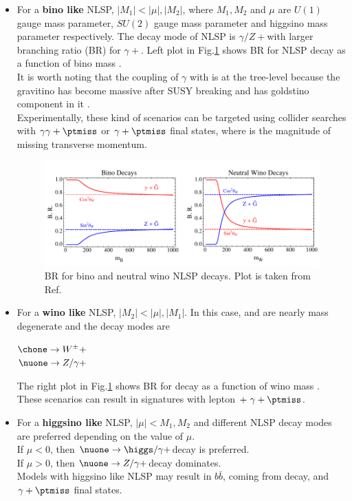 \begin{itemize}
\item For a \textbf{bino like} NLSP, $|M_1| < |\mu|, |M_2|$, where $M_1, M_2$ and $\mu$ are $U(1)$ gauge mass parameter, $SU(2)$ gauge mass parameter and higgsino mass parameter respectively. The decay mode of NLSP is $\gamma/Z +$\grav with larger branching ratio (BR) for  $\gamma +$\grav. Left plot in Fig.\ref{fig:NLSPwinoBinoBR} shows BR for NLSP decay as a function of bino mass \cite{Ruderman:2011vv}.\\
It is worth noting that the coupling of $\gamma$ with  is at the tree-level because the gravitino has become massive after SUSY breaking and has goldstino component in it \cite{Martin:1997ns}.\\
Experimentally, these kind of scenarios can be targeted using collider searches with $\gamma\gamma+\ptmiss$ or $\gamma+\ptmiss$ final states, where \ptmiss is the magnitude of missing transverse momentum.

\begin{figure}[h!]
\centering
\includegraphics[width=0.8\linewidth]{../Figures/NLSPwinoBinoBR}
\caption[BR for bino and neutral wino NLSP decays]{BR for bino and neutral wino NLSP decays. Plot is taken from Ref.\cite{Ruderman:2011vv}}
\label{fig:NLSPwinoBinoBR}
\end{figure}

\item For a \textbf{wino like} NLSP, $|M_2| < |\mu|, |M_1|$. In this case, \nuone and \chone are nearly mass degenerate and the decay modes are
\begin{center}
$\chone \rightarrow W^\pm + $\grav \\%
$\nuone \rightarrow Z/\gamma + $\grav
\end{center}
The right plot in Fig.\ref{fig:NLSPwinoBinoBR} shows BR for \nuone decay as a function of wino mass \cite{Ruderman:2011vv}. These scenarios can result in signatures with lepton $+\ \gamma+\ptmiss$.

\item For a \textbf{higgsino like} NLSP, $|\mu| < M_1,M_2$ and different NLSP decay modes are preferred depending on the value of $\mu$.\\
If $\mu < 0$, then $\nuone \rightarrow \higgs/\gamma + $\grav decay is preferred.\\
If $\mu > 0$, then $\nuone \rightarrow Z/\gamma + $\grav decay dominates.\\
Models with higgsino like NLSP may result in $b\bar{b}$, coming from \higgs decay, and $\gamma+\ptmiss$ final states.
\end{itemize}

